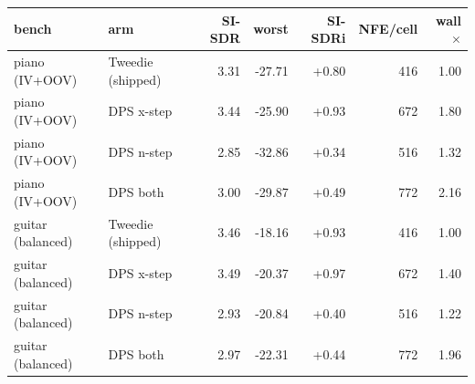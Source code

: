 \begin{tabular}{llrrrrr}
\toprule
bench & arm & SI-SDR & worst & SI-SDRi & NFE/cell & wall$\times$ \\
\midrule
piano (IV+OOV) & Tweedie (shipped) & 3.31 & -27.71 & +0.80 & 416 & 1.00 \\
piano (IV+OOV) & DPS x-step & 3.44 & -25.90 & +0.93 & 672 & 1.80 \\
piano (IV+OOV) & DPS n-step & 2.85 & -32.86 & +0.34 & 516 & 1.32 \\
piano (IV+OOV) & DPS both & 3.00 & -29.87 & +0.49 & 772 & 2.16 \\
guitar (balanced) & Tweedie (shipped) & 3.46 & -18.16 & +0.93 & 416 & 1.00 \\
guitar (balanced) & DPS x-step & 3.49 & -20.37 & +0.97 & 672 & 1.40 \\
guitar (balanced) & DPS n-step & 2.93 & -20.84 & +0.40 & 516 & 1.22 \\
guitar (balanced) & DPS both & 2.97 & -22.31 & +0.44 & 772 & 1.96 \\
\bottomrule
\end{tabular}
